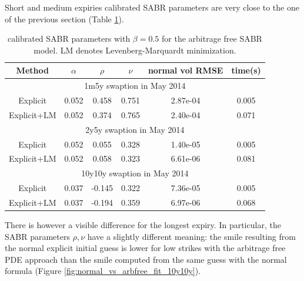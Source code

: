 \documentclass[]{rAMF2e}
\begin{document}
Short and medium expiries calibrated SABR parameters are very close to the one of the previous section (Table \ref{tbl:arbfree_sabr_fit}).
\begin{table}[h]
\begin{center}
\caption{\label{tbl:arbfree_sabr_fit}calibrated SABR parameters with $\beta=0.5$ for the arbitrage free SABR model. LM denotes Levenberg-Marquardt minimization.}
\begin{tabular}{c c c c c c}
\hline
Method & $\alpha$ & $\rho$ &$\nu$ & normal vol RMSE & time(s) \\
\hline
\multicolumn{6}{c}{1m5y swaption in May 2014}\\
\hline
Explicit & 0.052 & 0.458 & 0.751 & 2.87e-04 & 0.005 \\
Explicit+LM & 0.052 & 0.374 & 0.765 & 2.40e-04 & 0.071\\
\hline
\multicolumn{6}{c}{2y5y swaption in May 2014}\\
\hline
Explicit & 0.052 & 0.055 & 0.328 & 1.40e-05 & 0.005\\
Explicit+LM & 0.052 & 0.058 & 0.323 & 6.61e-06 & 0.081\\
\hline
\multicolumn{6}{c}{10y10y swaption in May 2014}\\
\hline
Explicit & 0.037 & -0.145 & 0.322 & 7.36e-05 & 0.005\\
Explicit+LM & 0.037 & -0.194 & 0.359 & 6.97e-06 & 0.068\\
\hline
\end{tabular}
\end{center}
\end{table}

There is however a visible difference for the longest expiry. In particular, the SABR parameters $\rho, \nu$ have a slightly different meaning: the smile resulting from the normal explicit initial guess is lower for low strikes with the arbitrage free PDE approach than the smile computed from the same guess with the normal formula (Figure \ref{fig:normal_vs_arbfree_fit_10y10y}).
\end{document}
